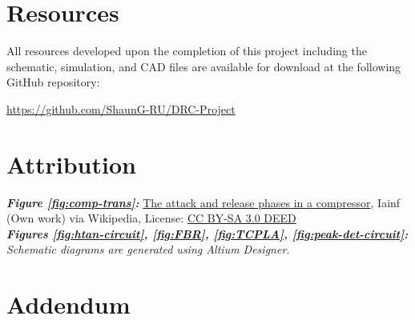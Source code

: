\documentclass[10pt]{article}
\begin{document}
\begin{multicols*}{2}
        \vspace{15ex}

        \section*{Resources}
            All resources developed upon the completion of this project including the schematic, simulation, and CAD files are available for download at the following GitHub repository:

            \vspace{10pt}
            \noindent
            \begin{minipage}{\linewidth}
                \centering
                \href{https://github.com/ShaunG-RU/DRC-Project}{https://github.com/ShaunG-RU/DRC-Project}
            \end{minipage}

        \section*{Attribution}
            \footnotesize{
                \textit{\textbf{Figure \ref{fig:comp-trans}:}} \href{https://en.wikipedia.org/wiki/Dynamic_range_compression#/media/File:Audio_Compression_Attack_and_Release-2.svg}{The attack and release phases in a compressor}, Iainf (Own work) via Wikipedia, License: \href{https://creativecommons.org/licenses/by-sa/3.0/}{CC BY-SA 3.0 DEED}\\

                \noindent\textit{\textbf{Figures \ref{fig:htan-circuit}, \ref{fig:FBR}, \ref{fig:TCPLA}, \ref{fig:peak-det-circuit}:} Schematic diagrams are generated using Altium Designer.}\\
            }

        \printbibliography

    \end{multicols*}

    \newpage

    \section*{Addendum}
\end{document}
